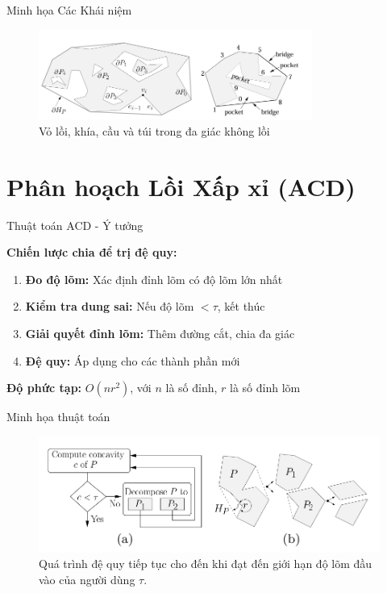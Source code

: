 \documentclass[aspectratio=169]{beamer}
\begin{document}
\begin{frame}{Minh họa Các Khái niệm}
    \begin{figure}
        \centering
        \includegraphics[width=0.8\textwidth]{../imgs/ACD-5.png}
        \caption{\small Vỏ lồi, khía, cầu và túi trong đa giác không lồi}
    \end{figure}
\end{frame}

\section{Phân hoạch Lồi Xấp xỉ (ACD)}

\begin{frame}{Thuật toán ACD - Ý tưởng}

    \textbf{Chiến lược chia để trị đệ quy:}
    \begin{enumerate}
        \item \textbf{Đo độ lõm:} Xác định đỉnh lõm có độ lõm lớn nhất
        \item \textbf{Kiểm tra dung sai:} Nếu độ lõm $< \tau$, kết thúc
        \item \textbf{Giải quyết đỉnh lõm:} Thêm đường cắt, chia đa giác
        \item \textbf{Đệ quy:} Áp dụng cho các thành phần mới
    \end{enumerate}

    \vspace{1em}
    \textbf{Độ phức tạp:} $O(n r^2)$, với $n$ là số đỉnh, $r$ là số đỉnh lõm

\end{frame}

\begin{frame}{Minh họa thuật toán}
    \begin{figure}
        \centering
        \includegraphics[width=0.8\linewidth]{../imgs/ACD-1.png}
        \caption{Quá trình đệ quy tiếp tục cho đến khi đạt đến giới hạn độ lõm đầu vào của người dùng $\tau$.}
    \end{figure}
\end{frame}
\end{document}
